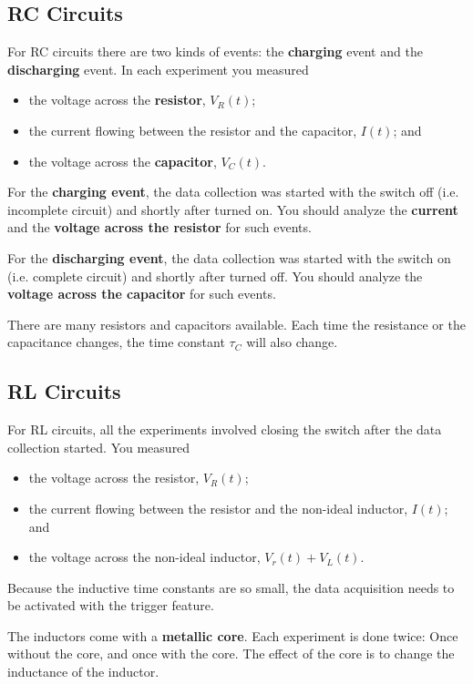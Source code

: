 \subsection{RC Circuits}
%
For RC circuits there are two kinds of events: the \textbf{charging} event and the \textbf{discharging} event. In each experiment you measured
\begin{itemize}
    \item the voltage across the \textbf{resistor}, $V_{R}(t)$;
    \item the current flowing between the resistor and the capacitor, $I(t)$; and
    \item the voltage across the \textbf{capacitor}, $V_{C}(t)$.
\end{itemize}
For the \textbf{charging event}, the data collection was started with the switch off (i.e. incomplete circuit) and shortly after turned on. You should analyze the \textbf{current} and the \textbf{voltage across the resistor} for such events.

For the \textbf{discharging event}, the data collection was started with the switch on (i.e. complete circuit) and shortly after turned off. You should analyze the \textbf{voltage across the capacitor} for such events.

There are many resistors and capacitors available. Each time the resistance or the capacitance changes, the time constant $\tau_{C}$ will also change.
%
\subsection{RL Circuits}
%
For RL circuits, all the experiments involved closing the switch after the data collection started. You measured
\begin{itemize}
    \item the voltage across the resistor, $V_{R}(t)$;
    \item the current flowing between the resistor and the non-ideal inductor, $I(t)$; and
    \item the voltage across the non-ideal inductor, $V_{r}(t) + V_{L}(t)$.
\end{itemize}
Because the inductive time constants are so small, the data acquisition needs to be activated with the trigger feature.

The inductors come with a \textbf{metallic core}. Each experiment is done twice: Once without the core, and once with the core. The effect of the core is to change the inductance of the inductor.

